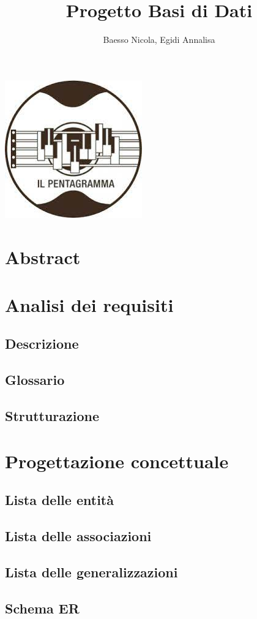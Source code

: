 \documentclass[12pt]{article}
\title{Progetto Basi di Dati}
\author{Baesso Nicola, Egidi Annalisa}
\begin{document}

\maketitle %
\begin{center} %
	\includegraphics{logo.jpeg}	
\end{center}
\newpage %
\tableofcontents %
\newpage
\section{Abstract}
\section{Analisi dei requisiti}
	\subsection{Descrizione}
	\subsection{Glossario}
	\subsection{Strutturazione}
\section{Progettazione concettuale}
	\subsection{Lista delle entità}
	\subsection{Lista delle associazioni}
	\subsection{Lista delle generalizzazioni}
	\subsection{Schema ER}
\end{document}

